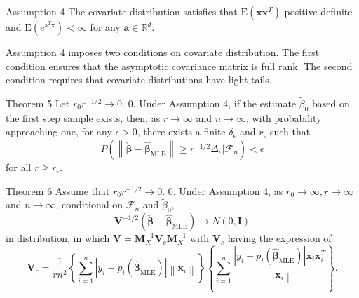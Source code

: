 \documentclass[12pt]{beamer}
\begin{document}
\begin{frame}{Assumption 4}
The covariate distribution satisfies that $\mathrm{E}\left(\mathbf{x} \mathbf{x}^{T}\right)$ positive definite and $\mathrm{E}\left(e^{\mathrm{a}^{T} \mathrm{x}}\right)<\infty$ for any $\mathbf{a}\in \mathbb{R}^d$.

Assumption 4 imposes two conditions on covariate distribution.
The first condition ensures that the asymptotic covariance
matrix is full rank.
The second condition requires that covariate distributions
have light tails.
\end{frame}

\begin{frame}{Theorem 5}
Let $r_0r^{-1/2} \to 0.$ 0. Under Assumption 4, if the estimate $\tilde{\beta}_0$  based on the first step sample exists, then, as $r\to \infty$ and $n \to \infty$, with probability approaching one, for any $\epsilon>0$, there exists a finite $\delta_{\epsilon}$ and $r_{\epsilon}$ such that
$$
P\left(\left\|\check{\boldsymbol{\beta}}-\hat{\boldsymbol{\beta}}_{\mathrm{MLE}}\right\| \geq r^{-1 / 2} \Delta_{\epsilon} | \mathcal{F}_{n}\right)<\epsilon
$$ 
for all $ r\ge r_{\epsilon}$.
\end{frame}

\begin{frame}{Theorem 6}
Assume that $r_0r^{-1/2} \to 0.$ 0. Under Assumption 4, as $r_0\to \infty, r\to \infty$ and $n \to \infty$,  conditional on $\mathcal{F}_n$ and $\tilde{\beta}_0$,
$$
\mathbf{V}^{-1 / 2}\left(\check{\boldsymbol{\beta}}-\hat{\boldsymbol{\beta}}_{\mathrm{MLE}}\right) \longrightarrow N(0, \mathbf{I})
$$
in distribution, in which $\mathbf{V}=\mathbf{M}_{X}^{-1} \mathbf{V}_{c} \mathbf{M}_{X}^{-1}$ with $\mathbf{V}_c$  having the
expression of
$$
\mathbf{V}_{c}=\frac{1}{r n^{2}}\left\{\sum_{i=1}^{n}\left|y_{i}-p_{i}\left(\hat{\boldsymbol{\beta}}_{\mathrm{MLE}}\right)\right|\left\|\mathbf{x}_{i}\right\|\right\}\left\{\sum_{i=1}^{n} \frac{\left|y_{i}-p_{i}\left(\hat{\boldsymbol{\beta}}_{\mathrm{MLE}}\right)\right| \mathbf{x}_{i} \mathbf{x}_{i}^{T}}{\left\|\mathbf{x}_{i}\right\|}\right\}.
$$
\end{frame}
\end{document}
